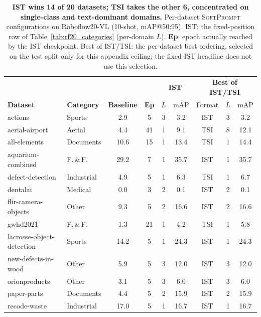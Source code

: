 \documentclass{article}
\newcommand{\ours}{\textsc{SoftPrompt}}
\newcommand{\rftwenty}{Roboflow20-VL}
\begin{document}
\begin{table}[h]
  \centering
  \caption{\textbf{IST wins 14 of 20 datasets; TSI takes the other 6, concentrated on single-class and text-dominant domains.}
    Per-dataset \ours{} configurations on \rftwenty{} (10-shot, mAP@50:95).
    IST: the fixed-position row of Table~\ref{tab:rf20_categories} (per-domain $L$).
    \textbf{Ep}: epoch actually reached by the IST checkpoint.
    Best of IST/TSI: the per-dataset best ordering, selected on the test split
    only for this appendix ceiling; the fixed-IST headline does not use this
    selection.}
  \label{tab:best_config}
  \small
  \setlength{\tabcolsep}{5pt}
  \begin{tabular}{llcc|cc|ccc}
    \toprule
    & & & & \multicolumn{2}{c|}{\textbf{IST}} & \multicolumn{3}{c}{\textbf{Best of IST/TSI}} \\
    \textbf{Dataset} & \textbf{Category} & \textbf{Baseline} & \textbf{Ep} & $L$ & mAP & Format & $L$ & mAP \\
    \midrule
    actions                   & Sports      &  2.9 &   5 & 3 &  3.2 & IST & 3 &  3.2 \\
    aerial-airport            & Aerial      &  4.4 &  41 & 1 &  9.1 & TSI & 8 & 12.1 \\
    all-elements              & Documents   & 10.6 &  15 & 1 & 13.4 & TSI & 1 & 14.4 \\
    aquarium-combined         & F.\,\&\,F.  & 29.2 &   7 & 1 & 35.7 & IST & 1 & 35.7 \\
    defect-detection          & Industrial  &  4.9 &   5 & 1 &  6.3 & TSI & 1 &  6.7 \\
    dentalai                  & Medical     &  0.0 &   3 & 2 &  0.1 & IST & 2 &  0.1 \\
    flir-camera-objects       & Other       &  9.3 &   5 & 2 & 16.6 & IST & 2 & 16.6 \\
    gwhd2021                  & F.\,\&\,F.  &  1.3 &  21 & 1 &  4.2 & TSI & 1 &  5.8 \\
    lacrosse-object-detection & Sports      & 14.2 &   5 & 1 & 24.3 & IST & 1 & 24.3 \\
    new-defects-in-wood       & Other       &  5.9 &   5 & 3 & 12.0 & IST & 3 & 12.0 \\
    orionproducts             & Other       &  3.1 &   5 & 3 &  6.0 & IST & 3 &  6.0 \\
    paper-parts               & Documents   &  4.4 &   5 & 2 & 15.9 & IST & 2 & 15.9 \\
    recode-waste              & Industrial  & 17.0 &   5 & 1 & 16.7 & IST & 1 & 16.7 \\

\end{tabular}
\end{table}
\end{document}
